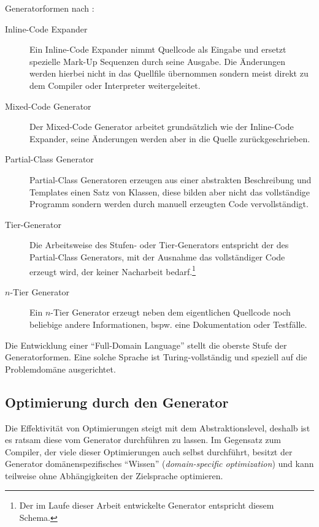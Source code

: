 Generatorformen nach \cite{herrington2003code}:
\begin{description}
    \item[Inline-Code Expander]
        Ein Inline-Code Expander nimmt Quellcode als Eingabe und ersetzt spezielle Mark-Up Sequenzen durch seine Ausgabe. Die Änderungen werden hierbei nicht in das Quellfile übernommen sondern meist direkt zu dem Compiler oder Interpreter weitergeleitet.
    \item[Mixed-Code Generator]
        Der Mixed-Code Generator arbeitet grundsätzlich wie der Inline-Code Expander, seine Änderungen werden aber in die Quelle zurückgeschrieben.
    \item[Partial-Class Generator]
        Partial-Class Generatoren erzeugen aus einer abstrakten Beschreibung und Templates einen Satz von Klassen, diese bilden aber nicht das vollständige Programm sondern werden durch manuell erzeugten Code vervollständigt. %
    \item[Tier-Generator]
        Die Arbeitsweise des Stufen- oder Tier-Generators entspricht der des Partial-Class Generators, mit der Ausnahme das vollständiger Code erzeugt wird, der keiner Nacharbeit bedarf.\footnote{Der im Laufe dieser Arbeit entwickelte Generator entspricht diesem Schema.}
    \item[$n$-Tier Generator] 
        Ein $n$-Tier Generator erzeugt neben dem eigentlichen Quellcode noch beliebige andere Informationen, bspw. eine Dokumentation oder Testfälle.
\end{description}

Die Entwicklung einer \enquote{Full-Domain Language} stellt die oberste Stufe der Generatorformen. Eine solche Sprache ist Turing-vollständig und speziell auf die Problemdomäne ausgerichtet.

\subsection{Optimierung durch den Generator}

Die Effektivität von Optimierungen steigt mit dem Abstraktionslevel, deshalb ist es ratsam diese vom Generator durchführen zu lassen. Im Gegensatz zum Compiler, der viele dieser Optimierungen auch selbst durchführt, besitzt der Generator domänenspezifisches \enquote{Wissen} (\emph{domain-specific optimization}) und kann teilweise ohne Abhängigkeiten der Zielsprache optimieren.

